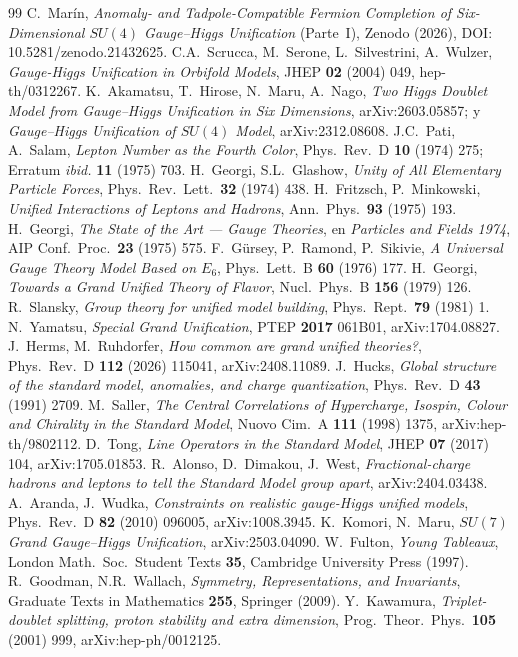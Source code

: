\documentclass[11pt,a4paper]{article}
\begin{document}
\begin{thebibliography}{99}
 C.~Mar\'in, \emph{Anomaly- and Tadpole-Compatible Fermion Completion of
Six-Dimensional $SU(4)$ Gauge--Higgs Unification} (Parte~I), Zenodo (2026),
DOI:\,10.5281/zenodo.21432625.
 C.A.~Scrucca, M.~Serone, L.~Silvestrini, A.~Wulzer, \emph{Gauge-Higgs
Unification in Orbifold Models}, JHEP \textbf{02} (2004) 049, hep-th/0312267.
 K.~Akamatsu, T.~Hirose, N.~Maru, A.~Nago, \emph{Two Higgs Doublet Model from
Gauge--Higgs Unification in Six Dimensions}, arXiv:2603.05857; y
\emph{Gauge--Higgs Unification of $SU(4)$ Model}, arXiv:2312.08608.
 J.C.~Pati, A.~Salam, \emph{Lepton Number as the Fourth Color},
Phys.\ Rev.\ D \textbf{10} (1974) 275; Erratum \emph{ibid.} \textbf{11} (1975) 703.
 H.~Georgi, S.L.~Glashow, \emph{Unity of All Elementary Particle
Forces}, Phys.\ Rev.\ Lett.\ \textbf{32} (1974) 438.
 H.~Fritzsch, P.~Minkowski, \emph{Unified Interactions of Leptons and
Hadrons}, Ann.\ Phys.\ \textbf{93} (1975) 193.
 H.~Georgi, \emph{The State of the Art --- Gauge Theories}, en
\emph{Particles and Fields 1974}, AIP Conf.\ Proc.\ \textbf{23} (1975) 575.
 F.~G\"ursey, P.~Ramond, P.~Sikivie, \emph{A Universal Gauge Theory Model Based
on $E_6$}, Phys.\ Lett.\ B \textbf{60} (1976) 177.
 H.~Georgi, \emph{Towards a Grand Unified Theory of Flavor},
Nucl.\ Phys.\ B \textbf{156} (1979) 126.
 R.~Slansky, \emph{Group theory for unified model building},
Phys.\ Rept.\ \textbf{79} (1981) 1.
 N.~Yamatsu, \emph{Special Grand Unification}, PTEP \textbf{2017} 061B01,
arXiv:1704.08827.
 J.~Herms, M.~Ruhdorfer, \emph{How common are grand unified
theories?}, Phys.\ Rev.\ D \textbf{112} (2026) 115041, arXiv:2408.11089.
 J.~Hucks, \emph{Global structure of the standard model, anomalies, and
charge quantization}, Phys.\ Rev.\ D \textbf{43} (1991) 2709.
 M.~Saller, \emph{The Central Correlations of Hypercharge, Isospin, Colour
and Chirality in the Standard Model}, Nuovo Cim.\ A \textbf{111} (1998) 1375,
arXiv:hep-th/9802112.
 D.~Tong, \emph{Line Operators in the Standard Model}, JHEP \textbf{07}
(2017) 104, arXiv:1705.01853.
 R.~Alonso, D.~Dimakou, J.~West, \emph{Fractional-charge hadrons and
leptons to tell the Standard Model group apart}, arXiv:2404.03438.
 A.~Aranda, J.~Wudka, \emph{Constraints on realistic gauge-Higgs
unified models}, Phys.\ Rev.\ D \textbf{82} (2010) 096005, arXiv:1008.3945.
 K.~Komori, N.~Maru, \emph{$SU(7)$ Grand Gauge--Higgs Unification},
arXiv:2503.04090.
 W.~Fulton, \emph{Young Tableaux}, London Math.\ Soc.\ Student Texts
\textbf{35}, Cambridge University Press (1997).
 R.~Goodman, N.R.~Wallach, \emph{Symmetry, Representations, and Invariants},
Graduate Texts in Mathematics \textbf{255}, Springer (2009).
 Y.~Kawamura, \emph{Triplet-doublet splitting, proton stability and
extra dimension}, Prog.\ Theor.\ Phys.\ \textbf{105} (2001) 999, arXiv:hep-ph/0012125.
\end{thebibliography}
\end{document}
